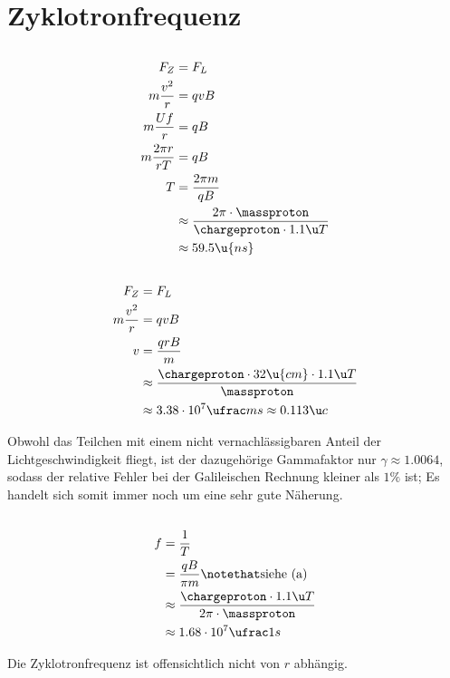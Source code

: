 \documentclass[11pt]{article}
\begin{document}
\section{Zyklotronfrequenz}
\subsection{}
\begin{align*}
    F_Z &= F_L\\
    m \frac{v^2}{r} &= q v B\\
    m \frac{Uf}{r} &= q B\\
    m \frac{2\pi r}{rT} &= q B\\
    T &= \frac{2\pi m}{q B}\\
    &\approx \frac{2\pi \cdot \massproton}{\chargeproton \cdot 1.1\u T}\\
    &\approx 59.5\u{ns}
\end{align*}

\subsection{}
\begin{align*}
    F_Z &= F_L\\
    m \frac{v^2}{r} &= q v B\\
    v &= \frac{q r B}{m}\\
    &\approx \frac{\chargeproton \cdot 32 \u{cm}\cdot 1.1 \u T}{\massproton}\\
    &\approx 3.38 \cdot 10^{7}\ufrac ms \approx 0.113 \u c
\end{align*}
\begin{adjustwidth}{20pt}{}
    Obwohl das Teilchen mit einem nicht vernachlässigbaren Anteil der Lichtgeschwindigkeit fliegt,
    ist der dazugehörige Gammafaktor nur $\gamma \approx 1.0064$, sodass 
    der relative Fehler bei der Galileischen Rechnung kleiner als $1\%$ ist; Es handelt sich somit 
    immer noch um eine sehr gute Näherung.  
\end{adjustwidth}
\subsection{}
\begin{align*}
    f &= \frac 1 T\\
    &=  \frac{q B}{\pi m} \notethat \text{siehe (a)}\\
    &\approx \frac{\chargeproton \cdot 1.1\u T}{2\pi \cdot \massproton}\\
    &\approx 1.68\cdot 10^7 \ufrac 1s
\end{align*}
\begin{adjustwidth}{20pt}{}
    Die Zyklotronfrequenz ist offensichtlich nicht von $r$ abhängig.
\end{adjustwidth}
\end{document}
